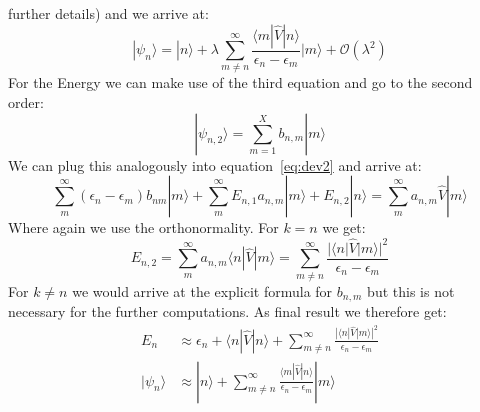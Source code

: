 further details) and we arrive
at:
\begin{equation}
    |\psi_{n}\rangle = |n\rangle + \lambda \sum_{m\neq n}^{\infty}
    \frac{\langle m |\hat{V}|n \rangle}{\epsilon_n - \epsilon_m}  
    |m \rangle  + \mathcal{O}(\lambda^2)
\end{equation}
For the Energy we can make use of the third equation and go to
the second order:
\begin{equation}
|\psi_{n,2}\rangle  = \sum_{m=1}^{X} b_{n,m} |m \rangle 
\end{equation}
We can plug this analogously into equation~\eqref{eq:dev2} and
arrive at:
\begin{equation}
 \sum_{m}^{\infty} (\epsilon_n - \epsilon_m) b_{nm} |m\rangle +
 \sum_{m}^{\infty} E_{n,1} a_{n,m} |m \rangle + E_{n,2} |n \rangle =
 \sum_{m}^{\infty} a_{n,m} \hat{V} |m \rangle
\end{equation}
Where again we use the orthonormality. For $k=n$ we get:
\begin{equation}
    E_{n,2} = \sum_{m}^{\infty} a_{n,m} \langle n |\hat{V}|m\rangle
= \sum_{m\neq n}^{\infty}\frac{|\langle n | \hat{V} | m \rangle |^2}
    {\epsilon_n - \epsilon_m}
\end{equation}
For $k\neq n$ we would arrive at the explicit formula for $b_{n,m}$
but this is not necessary for the further computations.
As final result we therefore get:
\begin{align}
    E_n &\approx \epsilon_n + \langle n|\hat{V} | n \rangle +
\sum_{m\neq n}^{\infty}\frac{|\langle n | \hat{V} | m \rangle |^2}
    {\epsilon_n - \epsilon_m} \\
    |\psi_n \rangle &\approx 
    |n\rangle + \sum_{m\neq n}^{\infty}
    \frac{\langle m |\hat{V}|n \rangle}{\epsilon_n - \epsilon_m}  
    |m \rangle 
\end{align}
